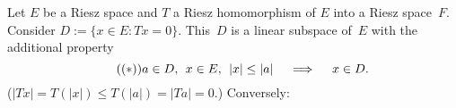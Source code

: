 \documentclass[main.tex]{subfiles}
\begin{document}
%
%
\begin{psec}{}
\label{2.4}
Let $E$ be a Riesz space and $T$ a Riesz homomorphism of $E$
into a Riesz space~$F$.
Consider
 $D:=\{x\in E\colon Tx=0\}$.
This~$D$ is a linear subspace of~$E$ 
with the additional property
\begin{equation}
\tag{$(*)$}
\label{eq2.4}
a\in D\text{, }\; x\in E\text{, }\; |x|\leq |a| 
  \quad \implies \quad x\in D\text{. }
\end{equation}
($|Tx|=T(|x|)\leq T(|a|)=|Ta|=0$.)  
Conversely:
\end{psec}
\clearpage
\end{document}
